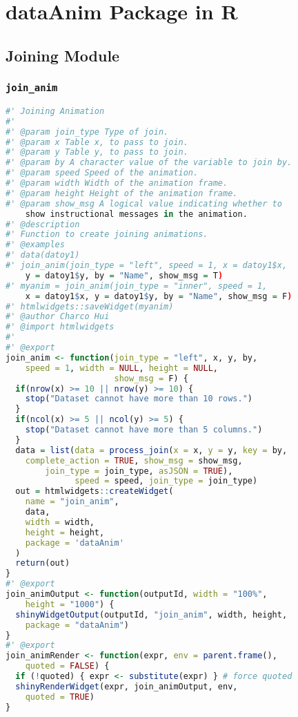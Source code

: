 
\chapter{\textbf{dataAnim} Package in \textsf{R}} \label{AppendixA}

\section{Joining Module}

\subsection{\texttt{join\_anim}}
\begin{lstlisting}[language=R]
#' Joining Animation
#'
#' @param join_type Type of join.
#' @param x Table x, to pass to join.
#' @param y Table y, to pass to join.
#' @param by A character value of the variable to join by.
#' @param speed Speed of the animation.
#' @param width Width of the animation frame.
#' @param height Height of the animation frame.
#' @param show_msg A logical value indicating whether to 
    show instructional messages in the animation.
#' @description
#' Function to create joining animations.
#' @examples
#' data(datoy1)
#' join_anim(join_type = "left", speed = 1, x = datoy1$x, 
    y = datoy1$y, by = "Name", show_msg = T)
#' myanim = join_anim(join_type = "inner", speed = 1, 
    x = datoy1$x, y = datoy1$y, by = "Name", show_msg = F)
#' htmlwidgets::saveWidget(myanim)
#' @author Charco Hui
#' @import htmlwidgets
#'
#' @export
join_anim <- function(join_type = "left", x, y, by, 
    speed = 1, width = NULL, height = NULL,
                      show_msg = F) {
  if(nrow(x) >= 10 || nrow(y) >= 10) {
    stop("Dataset cannot have more than 10 rows.")
  }
  if(ncol(x) >= 5 || ncol(y) >= 5) {
    stop("Dataset cannot have more than 5 columns.")
  }
  data = list(data = process_join(x = x, y = y, key = by, 
    complete_action = TRUE, show_msg = show_msg, 
        join_type = join_type, asJSON = TRUE),
              speed = speed, join_type = join_type)
  out = htmlwidgets::createWidget(
    name = "join_anim",
    data,
    width = width,
    height = height,
    package = 'dataAnim'
  )
  return(out)
}
#' @export
join_animOutput <- function(outputId, width = "100%", 
    height = "1000") {
  shinyWidgetOutput(outputId, "join_anim", width, height,
    package = "dataAnim")
}
#' @export
join_animRender <- function(expr, env = parent.frame(), 
    quoted = FALSE) {
  if (!quoted) { expr <- substitute(expr) } # force quoted
  shinyRenderWidget(expr, join_animOutput, env, 
    quoted = TRUE)
}

\end{lstlisting}

